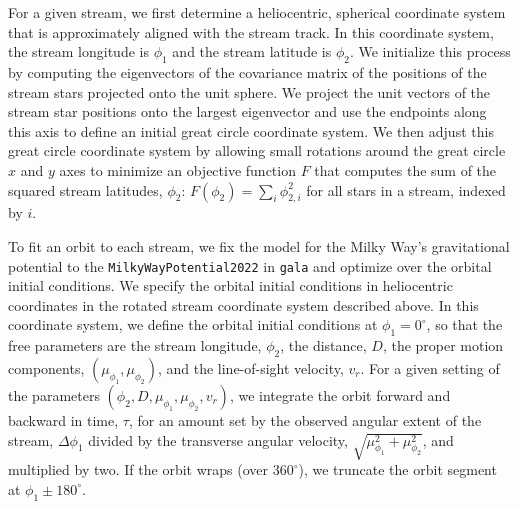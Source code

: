 \documentclass[final,5p,times,twocolumn,authoryear]{elsarticle}
\begin{document}
For a given stream, we first determine a heliocentric, spherical coordinate system that
is approximately aligned with the stream track.
In this coordinate system, the stream longitude is $\phi_1$ and the stream latitude is
$\phi_2$.
We initialize this process by computing the eigenvectors of the covariance matrix of the
positions of the stream stars projected onto the unit sphere.
We project the unit vectors of the stream star positions onto the largest eigenvector
and use the endpoints along this axis to define an initial great circle coordinate
system.
We then adjust this great circle coordinate system by allowing small rotations around
the great circle $x$ and $y$ axes to minimize an objective function $F$ that computes
the sum of the squared stream latitudes, $\phi_2$: $F(\phi_2) = \sum_i \phi_{2,i}^2$ for
all stars in a stream, indexed by $i$.

To fit an orbit to each stream, we fix the model for the Milky Way's gravitational
potential to the \texttt{MilkyWayPotential2022} in \texttt{gala}
\citep{price-whelan:2017} and optimize over the orbital initial conditions.
We specify the orbital initial conditions in heliocentric coordinates in the rotated
stream coordinate system described above.
In this coordinate system, we define the orbital initial conditions at $\phi_1=0^\circ$,
so that the free parameters are the stream longitude, $\phi_2$, the distance, $D$, the
proper motion components, $(\mu_{\phi_1}, \mu_{\phi_2})$, and the line-of-sight
velocity, $v_r$.
For a given setting of the parameters $(\phi_2, D, \mu_{\phi_1}, \mu_{\phi_2}, v_r)$, we
integrate the orbit forward and backward in time, $\tau$, for an amount set by the
observed angular extent of the stream, $\Delta \phi_1$ divided by the transverse angular
velocity, $\sqrt{\mu_{\phi_1}^2 + \mu_{\phi_2}^2}$, and multiplied by two.
If the orbit wraps (over $360^\circ$), we truncate the orbit segment at $\phi_1 \pm
180^\circ$.
\end{document}

